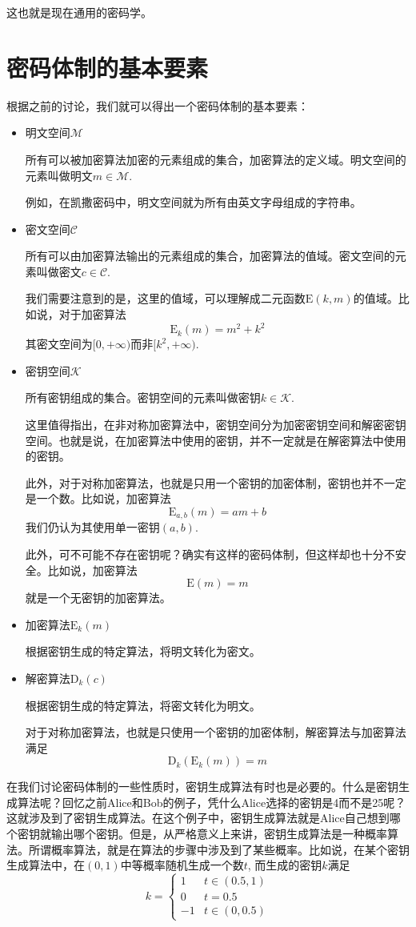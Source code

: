 \documentclass[UTF8]{ctexrep}
\def\pth#1{\left( {#1}\right)}
\def\E#1#2{{\mathrm{E}_{#1}\left({#2}\right)}}
\def\D#1#2{{\mathrm{D}_{#1}\left({#2}\right)}}
\begin{document}
这也就是现在通用的密码学。
\section{密码体制的基本要素}
根据之前的讨论，我们就可以得出一个密码体制的基本要素：
\begin{itemize}
    \item 明文空间$\mathcal{M}$\par
    所有可以被加密算法加密的元素组成的集合，加密算法的定义域。明文空间的元素叫做明文$m\in\mathcal{M}$.\par
    例如，在凯撒密码中，明文空间就为所有由英文字母组成的字符串。
    \item 密文空间$\mathcal{C}$\par
    所有可以由加密算法输出的元素组成的集合，加密算法的值域。密文空间的元素叫做密文$c\in\mathcal{C}$.\par
    我们需要注意到的是，这里的值域，可以理解成二元函数$\mathrm{E}\pth{k, m}$的值域。比如说，对于加密算法
    \[\E{k}{m}=m^2+k^2\]
    其密文空间为$[0, +\infty)$而非$[k^2, +\infty)$.
    \item 密钥空间$\mathcal{K}$\par
    所有密钥组成的集合。密钥空间的元素叫做密钥$k\in\mathcal{K}$.\par
    这里值得指出，在非对称加密算法中，密钥空间分为加密密钥空间和解密密钥空间。也就是说，在加密算法中使用的密钥，并不一定就是在解密算法中使用的密钥。\par
    此外，对于对称加密算法，也就是只用一个密钥的加密体制，密钥也并不一定是一个数。比如说，加密算法
    \[\E{a, b}{m}=am+b\]
    我们仍认为其使用单一密钥$\pth{a, b}$.\par
    此外，可不可能不存在密钥呢？确实有这样的密码体制，但这样却也十分不安全。比如说，加密算法
    \[\mathrm{E}\pth{m}=m\]
    就是一个无密钥的加密算法。
    \item 加密算法$\E{k}{m}$\par
    根据密钥生成的特定算法，将明文转化为密文。
    \item 解密算法$\D{k}{c}$\par
    根据密钥生成的特定算法，将密文转化为明文。\par
    对于对称加密算法，也就是只使用一个密钥的加密体制，解密算法与加密算法满足
    \[\D{k}{\E{k}{m}}=m\]
\end{itemize}

在我们讨论密码体制的一些性质时，密钥生成算法有时也是必要的。什么是密钥生成算法呢？回忆之前Alice和Bob的例子，凭什么Alice选择的密钥是4而不是25呢？这就涉及到了密钥生成算法。在这个例子中，密钥生成算法就是Alice自己想到哪个密钥就输出哪个密钥。但是，从严格意义上来讲，密钥生成算法是一种概率算法。所谓概率算法，就是在算法的步骤中涉及到了某些概率。比如说，在某个密钥生成算法中，在$(0, 1)$中等概率随机生成一个数$t$, 而生成的密钥$k$满足
\[
    k=\begin{cases}1&t\in\pth{0.5, 1}\\0&t=0.5\\-1&t\in\pth{0, 0.5}\end{cases}
\]
\end{document}
